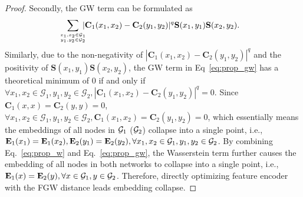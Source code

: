 \begin{proof}
Secondly, the GW term can be formulated as
\begin{equation}
    \!\!\!\!\!\sum_{x_1,x_2\in\G_1\atop y_1,y_2\in\G_2}\!\!\!\!|\mathbf{C}_1(x_1,x_2)-\mathbf{C}_2(y_1,y_2)|^q\mathbf{S}(x_1,y_1)\mathbf{S}(x_2,y_2).
\label{eq:prop_gw}
\end{equation}
Similarly, due to the non-negativity of $|\mathbf{C}_1(x_1,x_2)-\mathbf{C}_2(y_1,y_2)|^q$ and the positivity of $\mathbf{S}(x_1,y_1)\mathbf{S}(x_2,y_2)$, the GW term in Eq~\eqref{eq:prop_gw} has a theoretical minimum of 0 if and only if $ \forall x_1, x_2\in\mathcal{G}_1, y_1, y_2\in\mathcal{G}_2, |\mathbf{C}_1(x_1,x_2)-\mathbf{C}_2(y_1,y_2)|^q=0$.
Since $\mathbf{C}_1(x, x)=\mathbf{C}_2(y, y)=0$, $\forall x_1, x_2\in\mathcal{G}_1, y_1, y_2\in\mathcal{G}_2, \mathbf{C}_1(x_1, x_2)=\mathbf{C}_2(y_1, y_2)=0$, which essentially means the embeddings of all nodes in $\mathcal{G}_1$ ($\mathcal{G}_2$) collapse into a single point, i.e., $\mathbf{E}_1(x_1)=\mathbf{E}_1(x_2), \mathbf{E}_2(y_1)=\mathbf{E}_2(y_2), \forall x_1,x_2\in\mathcal{G}_1,y_1,y_2\in\mathcal{G}_2$. By combining Eq.~\eqref{eq:prop_w} and Eq.~\eqref{eq:prop_gw}, the Wasserstein term further causes the embedding of all nodes in both networks to collapse into a single point, i.e., $\mathbf{E}_1(x)=\mathbf{E}_2(y), \forall x\in\mathcal{G}_1,y\in\mathcal{G}_2$. Therefore, directly optimizing feature encoder with the FGW distance leads embedding collapse.
\end{proof}

\vspace{-10pt}
